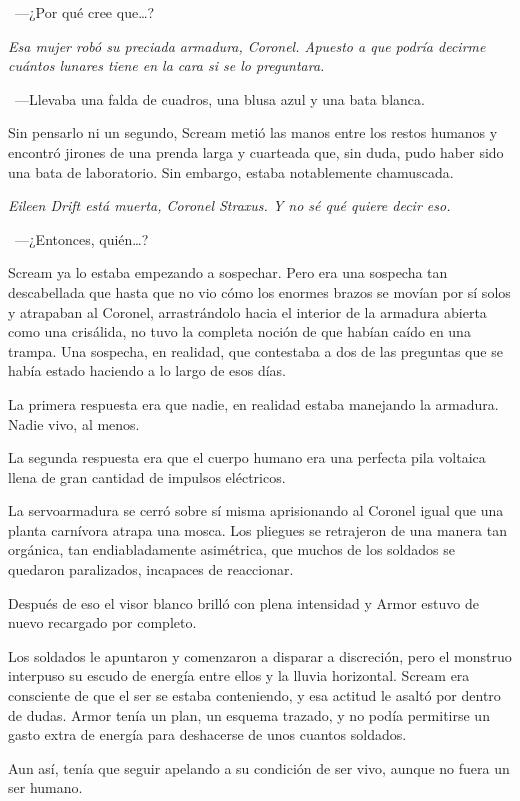 ~---¿Por qué cree que\dots?

\emph{Esa mujer robó su preciada armadura, Coronel. Apuesto a que podría decirme cuántos lunares tiene en la cara si se lo preguntara.}

~---Llevaba una falda de cuadros, una blusa azul y una bata blanca.

Sin pensarlo ni un segundo, Scream metió las manos entre los restos humanos y encontró jirones de una prenda larga y cuarteada que, sin duda, pudo haber sido una bata de laboratorio. Sin embargo, estaba notablemente chamuscada.

\emph{Eileen Drift está muerta, Coronel Straxus. Y no sé qué quiere decir eso.}

~---¿Entonces, quién\dots?

Scream ya lo estaba empezando a sospechar. Pero era una sospecha tan descabellada que hasta que no vio cómo los enormes brazos se movían por sí solos y atrapaban al Coronel, arrastrándolo hacia el interior de la armadura abierta como una crisálida, no tuvo la completa noción de que habían caído en una trampa. Una sospecha, en realidad, que contestaba a dos de las preguntas que se había estado haciendo a lo largo de esos días.

La primera respuesta era que nadie, en realidad estaba manejando la armadura. Nadie vivo, al menos.

La segunda respuesta era que el cuerpo humano era una perfecta pila voltaica llena de gran cantidad de impulsos eléctricos.

La servoarmadura se cerró sobre sí misma aprisionando al Coronel igual que una planta carnívora atrapa una mosca. Los pliegues se retrajeron de una manera tan orgánica, tan endiabladamente asimétrica, que muchos de los soldados se quedaron paralizados, incapaces de reaccionar.

Después de eso el visor blanco brilló con plena intensidad y Armor estuvo de nuevo recargado por completo.

Los soldados le apuntaron y comenzaron a disparar a discreción, pero el monstruo interpuso su escudo de energía entre ellos y la lluvia horizontal. Scream era consciente de que el ser se estaba conteniendo, y esa actitud le asaltó por dentro de dudas. Armor tenía un plan, un esquema trazado, y no podía permitirse un gasto extra de energía para deshacerse de unos cuantos soldados.

Aun así, tenía que seguir apelando a su condición de ser vivo, aunque no fuera un ser humano.

